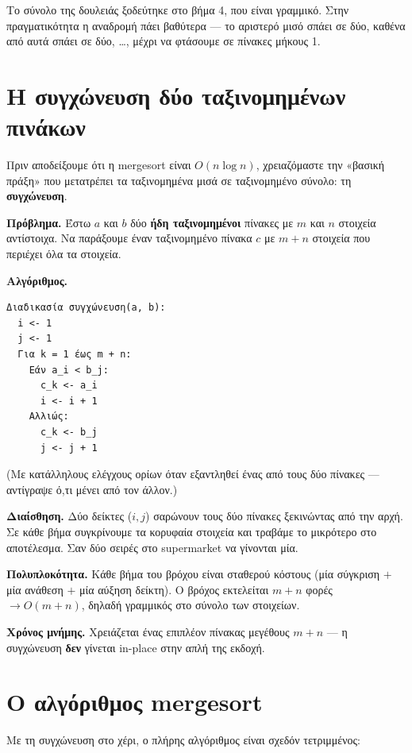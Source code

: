 \documentclass[11pt,a4paper]{article}
\begin{document}
Το σύνολο της δουλειάς ξοδεύτηκε στο βήμα 4, που είναι γραμμικό. Στην
πραγματικότητα η αναδρομή πάει βαθύτερα --- το αριστερό μισό σπάει σε δύο, καθένα
από αυτά σπάει σε δύο, \dots, μέχρι να φτάσουμε σε πίνακες μήκους 1.

\section{Η συγχώνευση δύο ταξινομημένων πινάκων}

Πριν αποδείξουμε ότι η mergesort είναι $O(n \log n)$, χρειαζόμαστε την «βασική
πράξη» που μετατρέπει τα ταξινομημένα μισά σε ταξινομημένο σύνολο: τη
\textbf{συγχώνευση}.

\begin{examplebox}
\textbf{Πρόβλημα.} Έστω $a$ και $b$ δύο \textbf{ήδη ταξινομημένοι} πίνακες με $m$
και $n$ στοιχεία αντίστοιχα. Να παράξουμε έναν ταξινομημένο πίνακα $c$ με $m+n$
στοιχεία που περιέχει όλα τα στοιχεία.

\textbf{Αλγόριθμος.}
\begin{codebox}
\begin{verbatim}
Διαδικασία συγχώνευση(a, b):
  i <- 1
  j <- 1
  Για k = 1 έως m + n:
    Εάν a_i < b_j:
      c_k <- a_i
      i <- i + 1
    Αλλιώς:
      c_k <- b_j
      j <- j + 1
\end{verbatim}
\end{codebox}
(Με κατάλληλους ελέγχους ορίων όταν εξαντληθεί ένας από τους δύο πίνακες ---
αντίγραψε ό,τι μένει από τον άλλον.)

\textbf{Διαίσθηση.} Δύο δείκτες ($i, j$) σαρώνουν τους δύο πίνακες ξεκινώντας από
την αρχή. Σε κάθε βήμα συγκρίνουμε τα κορυφαία στοιχεία και τραβάμε το μικρότερο
στο αποτέλεσμα. Σαν δύο σειρές στο supermarket να γίνονται μία.

\textbf{Πολυπλοκότητα.} Κάθε βήμα του βρόχου είναι σταθερού κόστους (μία σύγκριση
$+$ μία ανάθεση $+$ μία αύξηση δείκτη). Ο βρόχος εκτελείται $m+n$ φορές $\to
O(m+n)$, δηλαδή γραμμικός στο σύνολο των στοιχείων.

\textbf{Χρόνος μνήμης.} Χρειάζεται ένας επιπλέον πίνακας μεγέθους $m+n$ --- η
συγχώνευση \textbf{δεν} γίνεται in-place στην απλή της εκδοχή.
\end{examplebox}

\section{Ο αλγόριθμος mergesort}

Με τη συγχώνευση στο χέρι, ο πλήρης αλγόριθμος είναι σχεδόν τετριμμένος:
\end{document}
